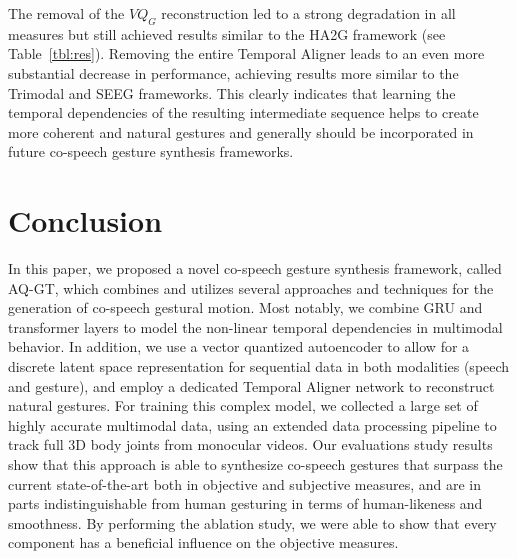 \documentclass[sigconf]{acmart}
\begin{document}
The removal of the $VQ_G$ reconstruction led to a strong degradation in all measures but still achieved results similar to the HA2G framework (see Table~\ref{tbl:res}). Removing the entire Temporal Aligner leads to an even more substantial decrease in performance, achieving results more similar to the Trimodal and SEEG frameworks. This clearly indicates that learning the temporal dependencies of the resulting intermediate sequence helps to create more coherent and natural gestures and generally should be incorporated in future co-speech gesture synthesis frameworks.



\section{Conclusion}
In this paper, we proposed a novel co-speech gesture synthesis framework, called  AQ-GT, which combines and utilizes several approaches and techniques for the generation of co-speech gestural motion. Most notably, we combine GRU and transformer layers to model the non-linear temporal dependencies in multimodal behavior. In addition, we use a vector quantized autoencoder to allow for a discrete latent space representation for sequential data in both modalities (speech and gesture), and employ a dedicated Temporal Aligner network to reconstruct natural gestures. For training this complex model, we collected a large set of highly accurate multimodal data, using an extended data processing pipeline to track full 3D body joints from monocular videos. Our evaluations study results show that this approach is able to synthesize co-speech gestures that surpass the current state-of-the-art both in objective and subjective measures, and are in parts indistinguishable from human gesturing in terms of human-likeness and smoothness. By performing the ablation study, we were able to 
show that every component has a beneficial influence on the objective measures.
\end{document}
